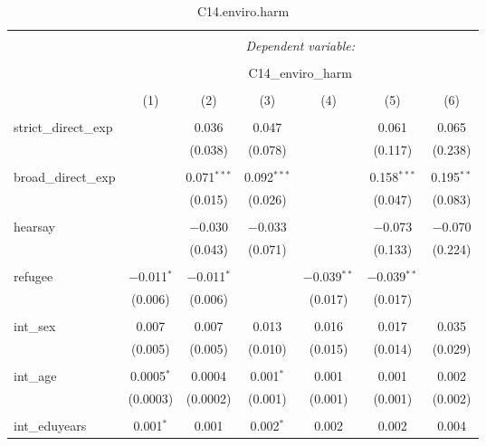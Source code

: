
\begin{table}[H] \centering 
  \caption{C14.enviro.harm} 
  \label{} 
\tiny 
\begin{tabular}{@{\extracolsep{4pt}}lcccccc} 
\\[-1.8ex]\hline 
\hline \\[-1.8ex] 
 & \multicolumn{6}{c}{\textit{Dependent variable:}} \\ 
\cline{2-7} 
\\[-1.8ex] & \multicolumn{6}{c}{C14\_enviro\_harm} \\ 
\\[-1.8ex] & (1) & (2) & (3) & (4) & (5) & (6)\\ 
\hline \\[-1.8ex] 
 strict\_direct\_exp &  & 0.036 & 0.047 &  & 0.061 & 0.065 \\ 
  &  & (0.038) & (0.078) &  & (0.117) & (0.238) \\ 
  & & & & & & \\ 
 broad\_direct\_exp &  & 0.071$^{***}$ & 0.092$^{***}$ &  & 0.158$^{***}$ & 0.195$^{**}$ \\ 
  &  & (0.015) & (0.026) &  & (0.047) & (0.083) \\ 
  & & & & & & \\ 
 hearsay &  & $-$0.030 & $-$0.033 &  & $-$0.073 & $-$0.070 \\ 
  &  & (0.043) & (0.071) &  & (0.133) & (0.224) \\ 
  & & & & & & \\ 
 refugee & $-$0.011$^{*}$ & $-$0.011$^{*}$ &  & $-$0.039$^{**}$ & $-$0.039$^{**}$ &  \\ 
  & (0.006) & (0.006) &  & (0.017) & (0.017) &  \\ 
  & & & & & & \\ 
 int\_sex & 0.007 & 0.007 & 0.013 & 0.016 & 0.017 & 0.035 \\ 
  & (0.005) & (0.005) & (0.010) & (0.015) & (0.014) & (0.029) \\ 
  & & & & & & \\ 
 int\_age & 0.0005$^{*}$ & 0.0004 & 0.001$^{*}$ & 0.001 & 0.001 & 0.002 \\ 
  & (0.0003) & (0.0002) & (0.001) & (0.001) & (0.001) & (0.002) \\ 
  & & & & & & \\ 
 int\_eduyears & 0.001$^{*}$ & 0.001 & 0.002$^{*}$ & 0.002 & 0.002 & 0.004 \\ 

\end{tabular}
\end{table}
